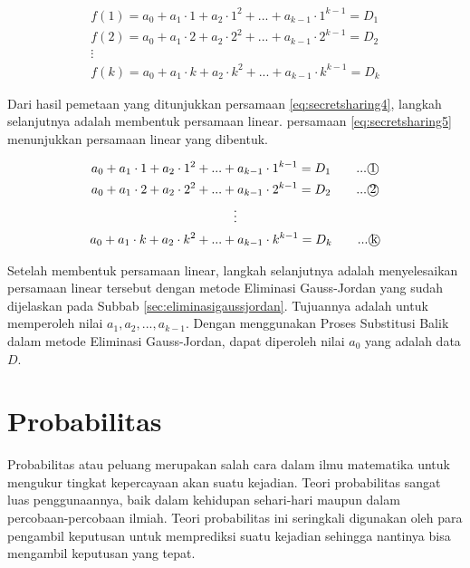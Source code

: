 \begin{gather}
	f(1) = a_0 + a_1\cdot 1 + a_2\cdot 1^2 + ... + a_{k-1}\cdot 1^{k-1} = D_1 \nonumber \\
	f(2) = a_0 + a_1\cdot 2 + a_2\cdot 2^2 + ... + a_{k-1}\cdot 2^{k-1} = D_2 \nonumber \\
	\vdots \nonumber \\
	f(k) = a_0 + a_1\cdot k + a_2\cdot k^2 + ... + a_{k-1}\cdot k^{k-1} = D_k \label{eq:secretsharing4}
\end{gather}

Dari hasil pemetaan yang ditunjukkan persamaan \ref{eq:secretsharing4}, langkah selanjutnya adalah membentuk persamaan linear. persamaan \ref{eq:secretsharing5} menunjukkan persamaan linear yang dibentuk.

\begin{gather}
	a_0 + a_1\cdot 1 + a_2\cdot 1^2 + ... + a_{k-1}\cdot 1^{k-1} = D_1 \qquad...\text{\textcircled{1}} \nonumber \\
	a_0 + a_1\cdot 2 + a_2\cdot 2^2 + ... + a_{k-1}\cdot 2^{k-1} = D_2 \qquad...\text{\textcircled{2}} \nonumber \\
	\vdots \nonumber \\
	a_0 + a_1\cdot k + a_2\cdot k^2 + ... + a_{k-1}\cdot k^{k-1} = D_k \qquad...\text{\textcircled{k}} \label{eq:secretsharing5}
\end{gather}

Setelah membentuk persamaan linear, langkah selanjutnya adalah menyelesaikan persamaan linear tersebut dengan metode Eliminasi Gauss-Jordan yang sudah dijelaskan pada Subbab \ref{sec:eliminasigaussjordan}. Tujuannya adalah untuk memperoleh nilai \begin{math}a_1, a_2, ..., a_{k-1}\end{math}. Dengan menggunakan Proses Substitusi Balik dalam metode Eliminasi Gauss-Jordan, dapat diperoleh nilai \begin{math}a_0\end{math} yang adalah data \begin{math}D\end{math}.

\section{Probabilitas}
Probabilitas atau peluang merupakan salah cara dalam ilmu matematika untuk mengukur tingkat kepercayaan akan suatu kejadian. Teori probabilitas sangat luas penggunaannya, baik dalam kehidupan sehari-hari maupun dalam percobaan-percobaan ilmiah. Teori probabilitas ini seringkali digunakan oleh para pengambil keputusan untuk memprediksi suatu kejadian sehingga nantinya bisa mengambil keputusan yang tepat.

